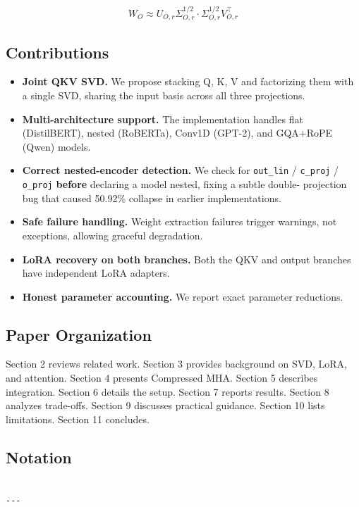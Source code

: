 \begin{equation}
W_O \approx U_{O, r} \Sigma_{O, r}^{1/2} \cdot \Sigma_{O, r}^{1/2} V_{O, r}^\top
\end{equation}

\subsection{Contributions}

\begin{itemize}
\item \textbf{Joint QKV SVD.} We propose stacking Q, K, V and factorizing them with a
  single SVD, sharing the input basis across all three projections.
\item \textbf{Multi-architecture support.} The implementation handles flat (DistilBERT),
  nested (RoBERTa), Conv1D (GPT-2), and GQA+RoPE (Qwen) models.
\item \textbf{Correct nested-encoder detection.} We check for \texttt{out\_lin} / \texttt{c\_proj} /
  \texttt{o\_proj} \textbf{before} declaring a model nested, fixing a subtle double-
  projection bug that caused 50.92\% collapse in earlier implementations.
\item \textbf{Safe failure handling.} Weight extraction failures trigger warnings, not
  exceptions, allowing graceful degradation.
\item \textbf{LoRA recovery on both branches.} Both the QKV and output branches have
  independent LoRA adapters.
\item \textbf{Honest parameter accounting.} We report exact parameter reductions.

\end{itemize}
\subsection{Paper Organization}

Section 2 reviews related work. Section 3 provides background on SVD, LoRA, 
and attention. Section 4 presents Compressed MHA. Section 5 describes 
integration. Section 6 details the setup. Section 7 reports results. Section 8 
analyzes trade-offs. Section 9 discusses practical guidance. Section 10 lists 
limitations. Section 11 concludes.



\subsection{Notation}

\begin{lstlisting}

---
\end{lstlisting}